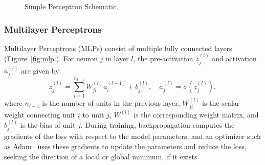 \documentclass[Ingles]{ic-tese-v3}
\begin{document}
\begin{figure}[!htb]
    \centering
    \caption{Simple Perceptron Schematic.}
    \label{fig:perceptron}
\end{figure}

\subsubsection{Multilayer Perceptrons}

Multilayer Perceptrons (MLPs) consist of multiple fully connected layers (Figure~\ref{fig:mlp}). For neuron $j$ in layer $l$, the pre-activation $z_j^{(l)}$ and activation $a_j^{(l)}$ are given by:
\begin{equation*}
z_j^{(l)} = \sum_{i=1}^{n_{l-1}} W_{ji}^{(l)} a_i^{(l-1)} + b_j^{(l)}, \quad a_j^{(l)} = \sigma \left( z_j^{(l)} \right),
\end{equation*}
\noindent where $n_{l-1}$ is the number of units in the previous layer, $W_{ji}^{(l)}$ is the scalar weight connecting unit $i$ to unit $j$, $W^{(l)}$ is the corresponding weight matrix, and $b_j^{(l)}$ is the bias of unit $j$. During training, backpropagation computes the gradients of the loss with respect to the model parameters, and an optimizer such as Adam~\cite{kingma2015adam} uses these gradients to update the parameters and reduce the loss, seeking the direction of a local or global minimum, if it exists.
\end{document}
